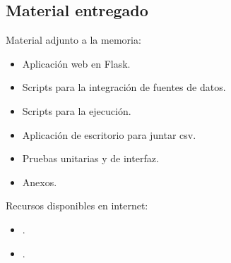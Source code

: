 \subsection{Material entregado}

Material adjunto a la memoria:

\begin{itemize}
	\item 
	Aplicación web en Flask.
	\item 
	Scripts para la integración de fuentes de datos.
	\item
	Scripts para la ejecución.
	\item 
	Aplicación de escritorio para juntar csv.
	\item 
	Pruebas unitarias y de interfaz.
	\item 
	Anexos.
\end{itemize}

Recursos disponibles en internet:

\begin{itemize}
	\item 
	.
	\item
	.
\end{itemize}
